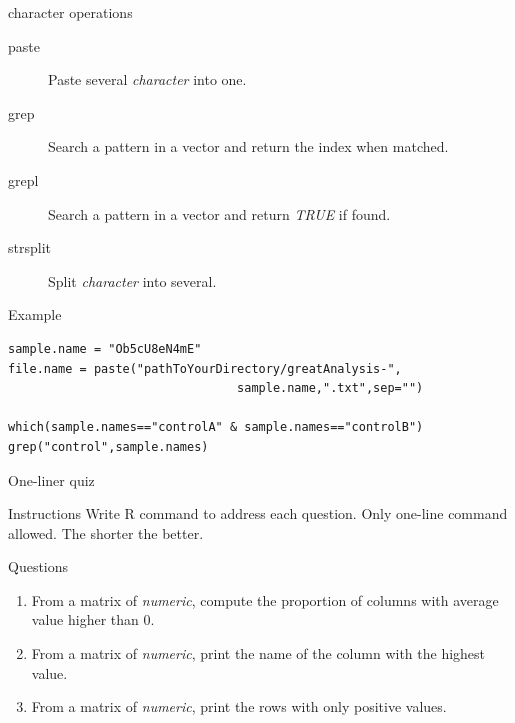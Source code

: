 \documentclass[10pt]{beamer}
\begin{document}
\begin{frame}[fragile]{{\sf character} operations}
  \begin{block}{}
    \begin{description}
      \item[paste] Paste several {\it character} into one.
      \item[grep] Search a pattern in a {\sf vector} and return the index when matched.
      \item[grepl] Search a pattern in a {\sf vector} and return {\it TRUE} if found.
      \item[strsplit] Split {\it character} into several.
    \end{description}
  \end{block}
  \begin{exampleblock}{Example}
\begin{verbatim}
sample.name = "Ob5cU8eN4mE"
file.name = paste("pathToYourDirectory/greatAnalysis-",
                                sample.name,".txt",sep="")

which(sample.names=="controlA" & sample.names=="controlB")
grep("control",sample.names)
\end{verbatim}  
  \end{exampleblock}
\end{frame}


\begin{frame}{One-liner quiz}
  \begin{block}{Instructions}
    Write R command to address each question. Only one-line command allowed. The shorter the better.
  \end{block}
  \begin{block}{Questions}
    \begin{enumerate}
    \item From a {\sf matrix} of {\it numeric}, compute the proportion of columns with average value higher than 0.
    \item From a {\sf matrix} of {\it numeric}, print the name of the column with the highest value.
    \item From a {\sf matrix} of {\it numeric}, print the rows with only positive values.
    \end{enumerate}
  \end{block}
\end{frame}
\end{document}
